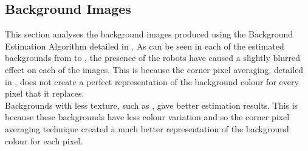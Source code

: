 \documentclass{article}
\begin{document}
\subsection{Background Images}
\label{sec:back}
This section analyses the background images produced using the Background Estimation Algorithm detailed in . As can be seen in each of the estimated backgrounds from  to , the presence of the robots have caused a slightly blurred effect on each of the images. This is because the corner pixel averaging, detailed in , does not create a perfect representation of the background colour for every pixel that it replaces.\\

Backgrounds with less texture, such as , gave better estimation results. This is because these backgrounds have less colour variation and so the corner pixel averaging technique created a much better representation of the background colour for each pixel.\\
\end{document}
